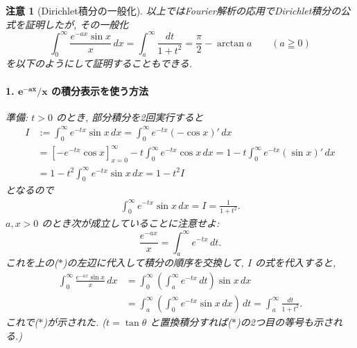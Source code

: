 \documentclass[12pt,twoside]{jarticle}
\theoremstyle{jplain}
\theoremstyle{jplain}
\theoremstyle{jplain}
\newtheorem{remark}[theorem]{注意}
\numberwithin{theorem}{section}
\numberwithin{equation}{section}
\numberwithin{figure}{section}
\numberwithin{table}{section}
\begin{document}
\begin{remark}[Dirichlet積分の一般化]
  \label{remark:Dirichlet-integral}
  以上ではFourier解析の応用でDirichlet積分の公式を証明したが,
  その一般化
  \begin{equation*}
    \int_0^\infty \frac{e^{-ax}\sin x}x\,dx
    =\int_a^\infty \frac{dt}{1+t^2}
    =\frac\pi2-\arctan a
    \qquad (a\geqq 0)
    \tag{$*$}
  \end{equation*}
  を以下のようにして証明することもできる.

  \paragraph{1. $\boldsymbol{e^{-ax}/x}$ の積分表示を使う方法}
  準備: $t>0$ のとき, 部分積分を2回実行すると
  \begin{align*}
    I&:=\int_0^\infty e^{-tx}\sin x\,dx
    =\int_0^\infty e^{-tx}(-\cos x)'\,dx
    \\
    &=[-e^{-tx}\cos x]_{x=0}^\infty-t\int_0^\infty e^{-tx}\cos x\,dx
    =1-t\int_0^\infty e^{-tx}(\sin x)'\,dx
    \\
    &=1-t^2\int_0^\infty e^{-tx}\sin x\,dx
    =1-t^2 I
  \end{align*}
  となるので
  \begin{align*}
    \int_0^\infty e^{-tx}\sin x\,dx = I = \frac1{1+t^2}.
  \end{align*}
  $a,x>0$ のとき次が成立していることに注意せよ:
  \begin{equation*}
    \frac{e^{-ax}}x = \int_a^\infty e^{-tx}\,dt.
  \end{equation*}
  これを上の($*$)の左辺に代入して積分の順序を交換して,
  $I$ の式を代入すると,
  \begin{align*}
    \int_0^\infty \frac{e^{-ax}\sin x}x\,dx
    &=\int_0^\infty \left(\int_a^\infty e^{-tx}\,dt\right) \sin x\,dx
    \\
    &=\int_a^\infty \left(\int_0^\infty e^{-tx}\sin x\,dx\right)\,dt
    =\int_a^\infty\frac{dt}{1+t^2}.
  \end{align*}
  これで($*$)が示された.
  ($t=\tan\theta$ と置換積分すれば($*$)の2つ目の等号も示される.)


\end{remark}
\end{document}
